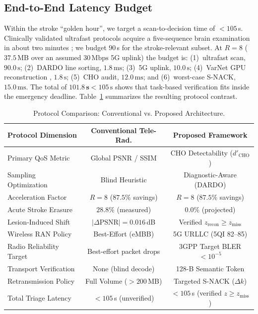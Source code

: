 \documentclass[conference]{IEEEtran}
\begin{document}
\subsection{End-to-End Latency Budget}
Within the stroke ``golden hour'', we target a scan-to-decision time of $<105\,$s. Clinically validated ultrafast protocols acquire a five-sequence brain examination in about two minutes \cite{lang2024twominute,altmann2024ultrafast}; we budget $90\,$s for the stroke-relevant subset. At $R=8$ ($37.5\,$MB over an assumed $30\,\text{Mbps}$ 5G uplink) the budget is: (1)~ultrafast scan, $90.0\,\text{s}$; (2)~DARDO line sorting, $1.8\,\text{ms}$; (3)~5G uplink, $10.0\,\text{s}$; (4)~VarNet GPU reconstruction \cite{sriram2020endtoend}, $1.8\,\text{s}$; (5)~CHO audit, $12.0\,\text{ms}$; and (6)~worst-case S-NACK, $15.0\,\text{ms}$. The total of $\mathbf{101.8\,\text{s}} < 105\,\text{s}$ shows that task-based verification fits inside the emergency deadline. Table~\ref{tab:comparison} summarizes the resulting protocol contrast.

\begin{table}[t]
\centering
\caption{Protocol Comparison: Conventional vs. Proposed Architecture.}
\label{tab:comparison}
\scriptsize
\setlength{\tabcolsep}{2pt}
\renewcommand{\arraystretch}{1.04}
\begin{tabular*}{\columnwidth}{@{\extracolsep{\fill}}p{2.35cm}cc@{}}
\toprule
\textbf{Protocol Dimension} & \textbf{Conventional Tele-Rad.} & \textbf{Proposed Framework} \\
\midrule
Primary QoS Metric & Global PSNR / SSIM & CHO Detectability ($d'_{\text{CHO}}$) \\
Sampling Optimization & Blind Heuristic & Diagnostic-Aware (DARDO) \\
Acceleration Factor & $R = 8$ ($87.5\%$ savings) & $R = 8$ ($87.5\%$ savings) \\
Acute Stroke Erasure & $\mathbf{28.8\%}$ (measured) & $\mathbf{0.0\%}$ (projected) \\
Lesion-Induced Shift & $|\Delta\text{PSNR}| = 0.016\,$dB & Verified $z_{\text{recon}} \ge z_{\text{miss}}$ \\
Wireless RAN Policy & Best-Effort (eMBB) & 5G URLLC (5QI 82--85) \\
Radio Reliability Target & Best-effort packet drops & 3GPP Target BLER $< 10^{-5}$ \\
Transport Verification & None (blind decode) & 128-B Semantic Token \\
Retransmission Policy & Full Volume ($>200\,$MB) & Targeted S-NACK ($\Delta k$) \\
Total Triage Latency & $<105\,$s (unverified) & $<105\,$s (verified $z \ge z_{\text{miss}}$) \\
\bottomrule
\end{tabular*}
\end{table}
\end{document}
